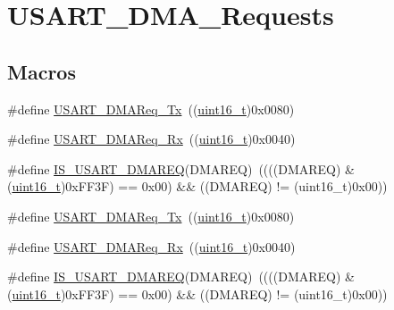\hypertarget{group___u_s_a_r_t___d_m_a___requests}{}\section{U\+S\+A\+R\+T\+\_\+\+D\+M\+A\+\_\+\+Requests}
\label{group___u_s_a_r_t___d_m_a___requests}
\subsection*{Macros}
\begin{DoxyCompactItemize}
\item 
\#define \hyperlink{group___u_s_a_r_t___d_m_a___requests_gae38097d8f82ba969c9812194022cae9a}{U\+S\+A\+R\+T\+\_\+\+D\+M\+A\+Req\+\_\+\+Tx}~((\hyperlink{_p_e___types_8h_a1f1825b69244eb3ad2c7165ddc99c956}{uint16\+\_\+t})0x0080)
\item 
\#define \hyperlink{group___u_s_a_r_t___d_m_a___requests_gaf33c13abb942251afab3297d8b8362ca}{U\+S\+A\+R\+T\+\_\+\+D\+M\+A\+Req\+\_\+\+Rx}~((\hyperlink{_p_e___types_8h_a1f1825b69244eb3ad2c7165ddc99c956}{uint16\+\_\+t})0x0040)
\item 
\#define \hyperlink{group___u_s_a_r_t___d_m_a___requests_ga8be7a899d21d82de2ee0a763b4564dc3}{I\+S\+\_\+\+U\+S\+A\+R\+T\+\_\+\+D\+M\+A\+R\+EQ}(D\+M\+A\+R\+EQ)~((((D\+M\+A\+R\+EQ) \& (\hyperlink{_p_e___types_8h_a1f1825b69244eb3ad2c7165ddc99c956}{uint16\+\_\+t})0x\+F\+F3\+F) == 0x00) \&\& ((\+D\+M\+A\+R\+E\+Q) != (uint16\+\_\+t)0x00))
\item 
\#define \hyperlink{group___u_s_a_r_t___d_m_a___requests_gae38097d8f82ba969c9812194022cae9a}{U\+S\+A\+R\+T\+\_\+\+D\+M\+A\+Req\+\_\+\+Tx}~((\hyperlink{_p_e___types_8h_a1f1825b69244eb3ad2c7165ddc99c956}{uint16\+\_\+t})0x0080)
\item 
\#define \hyperlink{group___u_s_a_r_t___d_m_a___requests_gaf33c13abb942251afab3297d8b8362ca}{U\+S\+A\+R\+T\+\_\+\+D\+M\+A\+Req\+\_\+\+Rx}~((\hyperlink{_p_e___types_8h_a1f1825b69244eb3ad2c7165ddc99c956}{uint16\+\_\+t})0x0040)
\item 
\#define \hyperlink{group___u_s_a_r_t___d_m_a___requests_ga8be7a899d21d82de2ee0a763b4564dc3}{I\+S\+\_\+\+U\+S\+A\+R\+T\+\_\+\+D\+M\+A\+R\+EQ}(D\+M\+A\+R\+EQ)~((((D\+M\+A\+R\+EQ) \& (\hyperlink{_p_e___types_8h_a1f1825b69244eb3ad2c7165ddc99c956}{uint16\+\_\+t})0x\+F\+F3\+F) == 0x00) \&\& ((\+D\+M\+A\+R\+E\+Q) != (uint16\+\_\+t)0x00))
\end{DoxyCompactItemize}



